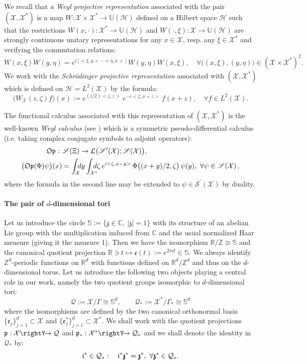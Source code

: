 \documentclass[12pt]{article}
\theoremstyle{definition}
\def\e{\mathfrak{e}}
\def\R{\mathbb{R}}
\def\Rd{\mathbb{R}^d}
\def\Z{\mathbb{Z}}
\def\Zd{\mathbb{Z}^d}
\def\Sb{\mathbb{S}}
\def\Co{{\mathbb C}}
\def\Op{\mathfrak{Op}}
\def\X{\mathcal X}
\def\H{\mathcal{H}}
\def\T{\mathcal{Q}}
\def\p{\mathfrak{p}}
\def\bz{\mathfrak{z}\hspace*{-4pt}\mathfrak{z}}
\def\z{\mathfrak{z}}
\def\repi{\rightY\hspace*{-4pt}\rightarrow}
\def\beq{\begin{equation}}
\def\eeq{\end{equation}}
\def\z{\mathfrak{z}}
\numberwithin{equation}{section}
\begin{document}
 We recall that \textit{a Weyl projective representation} associated with  the pair $(\X,\X^*)$ is a map $W:\X\times\X^*\rightarrow\mathbb{U}(\H)$ defined on a Hilbert space $\H$ such that the restrictions $W(x,\cdot):\X^*\rightarrow\mathbb{U}(\H)$ and $W(\cdot,\xi):\X\rightarrow\mathbb{U}(\H)$ are strongly continuous unitary representations for any $x\in\X$, resp. any $\xi\in\X^*$ and verifying the commutation relations:
\beq\label{F-10}
W(x,\xi)W(y,\eta)=e^{i[<\xi,y>-<\eta,x>]}W(y,\eta)W(x,\xi),\quad\forall\big((x,\xi),(y,\eta)\big)\in(\X\times\X^*)^2.
\eeq
We work with the \textit{Schr\"{o}dinger projective representation} associated with  $(\X,\X^*)$ which is defined on $\H=L^2(\X)$ by the formula:
\beq\label{F-W-R-prepr}
\big(W_{\X}(z,\zeta)f\big)(x):=e^{(i/2)<\zeta,z>}\,e^{-i<\zeta,x+z>}\,f(x+z),\quad\forall{f}\in{L}^2(\X).
\eeq

The functional calculus associated with this representation of $(\X,\X^*)$ is the well-known \textit{Weyl calculus} (see \cite{Ho-3}) which  is a symmetric pseudo-differential calculus (i.e. taking complex conjugate symbols to adjoint operators):
\beq\begin{split}\label{D-Op}
	\Op:\ &\mathscr{S}(\Xi)\rightarrow\mathcal{L}\big(\mathscr{S}^\prime(\X);\mathscr{S}(\X)\big),\\
	\big(\Op(\Phi)\psi\big)(x)&=\int_{\X}\hspace*{-0.2cm}dy\int_{\X^*}\hspace*{-0.3cm}d\zeta\,e^{i<\zeta,x-y>}\,\Phi\big((x+y)/2,\zeta\big)\,\psi(y),\ \forall\psi\in\mathscr{S}(\X)\,,
\end{split}\eeq
where the formula in the second line may be extended to $\psi\in\mathscr{S}^\prime(\X)$ by duality.



\paragraph{The pair of $d$-dimensional tori}
Let us introduce the circle  $\Sb:=\{\z\in\Co,\ |\z|=1\}$ with its structure of an abelian Lie group with the multiplication induced from $\Co$ and the usual normalized Haar measure (giving it the measure 1). Then we have the isomorphism $\R/\Z\cong\Sb$ and the canonical quotient projection $\R\ni{t}\mapsto\mathfrak{e}(t):={e^{2\pi{i}t}}\in\Sb$. We  always identify $\Zd$-periodic functions on $\Rd$ with functions defined on $\Rd/\Zd$ and thus on the $d$-dimensional torus. Let us introduce the following two objects playing a central role in our work, namely the two quotient groups isomorphic to $d$-dimensional tori: 
\beq\label{D-T-Tstar}
\T:=\X/\Gamma\cong\Sb^d,\qquad\T_*:=\X^*/\Gamma_*\cong\Sb^d
\eeq
where the isomorphisms are defined by the two canonical orthonormal basis $\{\e_j\}_{j=1}^d\subset\X$ and $\{\e^*_j\}_{j=1}^d\subset\X^*$. We shall work with the quotient projections $\p:\X\repi\T$ and $ \p_*:\X^*\repi\T_*$ and 
 we shall denote the identity in $\T_*$ by:
 \beq\label{DF-1}
\mathfrak{i}^*\in\T_*:\quad\mathfrak{i}^*\bz^*=\bz^*,\ \forall\bz^*\in\T_*.
\eeq
\end{document}
